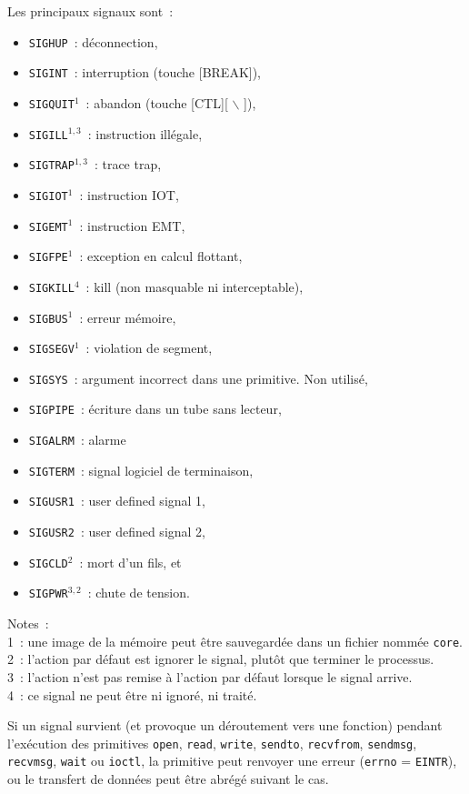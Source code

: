 \documentclass [twoside] {report}
\begin{document}
Les principaux signaux sont~:

\begin {itemize}
    \label {ps:sigv7}
    \item {\tt SIGHUP}~: déconnection,
    \item {\tt SIGINT}~: interruption (touche [BREAK]),
    \item {\tt SIGQUIT}{$^1$}~: abandon (touche [CTL]{[ $\backslash$ ]}),
    \item {\tt SIGILL}{$^{1, 3}$}~: instruction illégale,
    \item {\tt SIGTRAP}{$^{1, 3}$}~: trace trap,
    \item {\tt SIGIOT}{$^1$}~: instruction IOT,
    \item {\tt SIGEMT}{$^1$}~: instruction EMT,
    \item {\tt SIGFPE}{$^1$}~: exception en calcul flottant,
    \item {\tt SIGKILL}{$^4$}~: kill (non masquable ni interceptable),
    \item {\tt SIGBUS}{$^1$}~: erreur mémoire,
    \item {\tt SIGSEGV}{$^1$}~: violation de segment,
    \item {\tt SIGSYS}~: argument incorrect dans une primitive. Non utilisé,
    \item {\tt SIGPIPE}~: écriture dans un tube sans lecteur,
    \item {\tt SIGALRM}~: alarme
    \item {\tt SIGTERM}~: signal logiciel de terminaison,
    \item {\tt SIGUSR1}~: user defined signal 1,
    \item {\tt SIGUSR2}~: user defined signal 2,
    \item {\tt SIGCLD}{$^2$}~: mort d'un fils, et
    \item {\tt SIGPWR}{$^{3, 2}$}~: chute de tension.
\end {itemize}

Notes~: \\
1~: une image de la mémoire peut être sauvegardée dans
un fichier nommée {\tt core}. \\
2~: l'action par défaut est ignorer le
signal, plutôt que terminer le processus. \\
3~: l'action n'est pas remise à l'action par
défaut lorsque le signal arrive. \\
4~: ce signal ne peut être ni ignoré, ni traité.

Si un signal survient (et provoque un déroutement
vers une fonction) pendant l'exécution des primitives
{\tt open},
{\tt read},
{\tt write},
{\tt sendto},
{\tt recvfrom},
{\tt sendmsg},
{\tt recvmsg},
{\tt wait} ou
{\tt ioctl},
la primitive peut renvoyer une erreur ({\tt errno} = {\tt EINTR}),
ou le transfert de données peut être abrégé suivant le cas.
\end{document}
